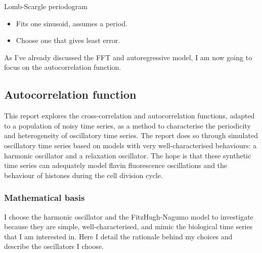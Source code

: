 Lomb-Scargle periodogram
\begin{itemize}
\item Fits one sinusoid, assumes a period.
\item Choose one that gives least error.
\end{itemize}

As I've already discussed the FFT and autoregressive model, I am now going to focus on the autocorrelation function.

\subsection{Autocorrelation function}
\label{subsec:analysis-characterisation-acf}

This report explores the cross-correlation and autocorrelation functions, adapted to a population of noisy time series, as a method to characterise the periodicity and heterogeneity of oscillatory time series.  The report does so through simulated oscillatory time series based on models with very well-characterised behaviours: a harmonic oscillator and a relaxation oscillator.  The hope is that these synthetic time series can adequately model flavin fluorescence oscillations and the behaviour of histones during the cell division cycle.

\subsubsection{Mathematical basis}
\label{subsubsec:analysis-correlation-maths}

I choose the harmonic oscillator and the FitzHugh-Nagumo model to investigate because they are simple, well-characterised, and mimic the biological time series that I am interested in.  Here I detail the rationale behind my choices and describe the oscillators I choose.

